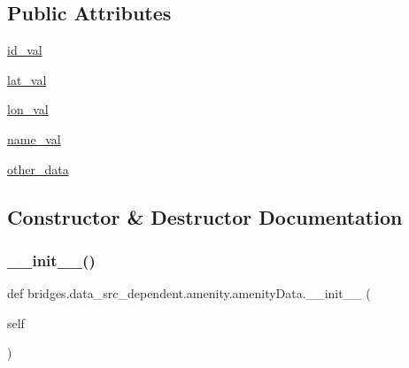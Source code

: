 \subsection*{Public Attributes}
\begin{DoxyCompactItemize}
\item 
\hyperlink{classbridges_1_1data__src__dependent_1_1amenity_1_1amenity_data_a772d1e7423a3c07e3df0a24b6770a07f}{id\+\_\+val}
\item 
\hyperlink{classbridges_1_1data__src__dependent_1_1amenity_1_1amenity_data_a62c0f3cd20edddddef2652895644a6ad}{lat\+\_\+val}
\item 
\hyperlink{classbridges_1_1data__src__dependent_1_1amenity_1_1amenity_data_afea1c532aaf9a63c97db085d83e8e3d9}{lon\+\_\+val}
\item 
\hyperlink{classbridges_1_1data__src__dependent_1_1amenity_1_1amenity_data_ab0a7b50037d63fcd49ccf2d19d4f0c75}{name\+\_\+val}
\item 
\hyperlink{classbridges_1_1data__src__dependent_1_1amenity_1_1amenity_data_ac3f1874a399079688cb87272426aa4f4}{other\+\_\+data}
\end{DoxyCompactItemize}


\subsection{Constructor \& Destructor Documentation}
\mbox{\label{classbridges_1_1data__src__dependent_1_1amenity_1_1amenity_data_a48a325b2504ed37868648096cd67309f}} 
\subsubsection{\texorpdfstring{\+\_\+\+\_\+init\+\_\+\+\_\+()}{\_\_init\_\_()}}
{\footnotesize\ttfamily def bridges.\+data\+\_\+src\+\_\+dependent.\+amenity.\+amenity\+Data.\+\_\+\+\_\+init\+\_\+\+\_\+ (\begin{DoxyParamCaption}\item[{}]{self }\end{DoxyParamCaption})}



